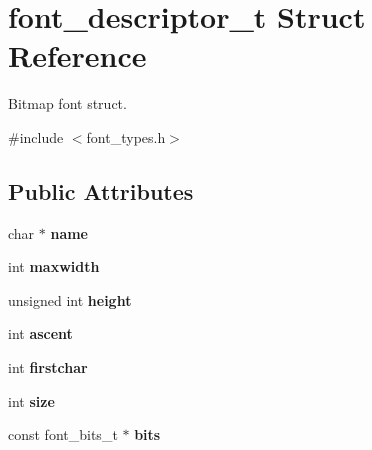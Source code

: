 \hypertarget{structfont__descriptor__t}{}\section{font\+\_\+descriptor\+\_\+t Struct Reference}
\label{structfont__descriptor__t}


Bitmap font struct.  




{\ttfamily \#include $<$font\+\_\+types.\+h$>$}

\subsection*{Public Attributes}
\begin{DoxyCompactItemize}
\item 
\mbox{\label{structfont__descriptor__t_a7a5f7569c87f8995fe45b207897a0327}} 
char $\ast$ {\bfseries name}
\item 
\mbox{\label{structfont__descriptor__t_a8e21a73982523c96f1ca5f39487956a7}} 
int {\bfseries maxwidth}
\item 
\mbox{\label{structfont__descriptor__t_abf7d9548e4312aa8ab0b6c868c5c4ae3}} 
unsigned int {\bfseries height}
\item 
\mbox{\label{structfont__descriptor__t_af23bcc2d3e1633f8153cb92df31de704}} 
int {\bfseries ascent}
\item 
\mbox{\label{structfont__descriptor__t_a9d7d7a8a663625f6fb6120cb9dc0d970}} 
int {\bfseries firstchar}
\item 
\mbox{\label{structfont__descriptor__t_abe0724754ffd1eefe3933c49c534eb8a}} 
int {\bfseries size}
\item 
\mbox{\label{structfont__descriptor__t_a8d9fbb0fd97c708b08e7f6fe5c866fab}} 
const font\+\_\+bits\+\_\+t $\ast$ {\bfseries bits}
\item 
\mbox{\label{structfont__descriptor__t_aaf4c05aa205048a217620ca26f8c5abb}} 

\end{DoxyCompactItemize}
